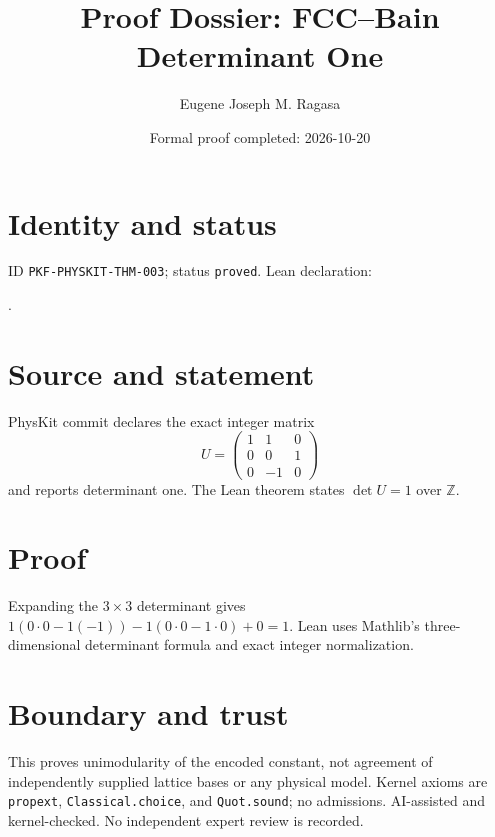 \documentclass[11pt]{article}
\title{Proof Dossier: FCC--Bain Determinant One}\author{Eugene Joseph M. Ragasa}\date{Formal proof completed: 2026-10-20}
\begin{document}
\maketitle
\section{Identity and status}
ID \texttt{PKF-PHYSKIT-THM-003}; status \texttt{proved}. Lean declaration:
\par{}.
\section{Source and statement}
PhysKit commit  declares the exact integer matrix
\[
U=\begin{pmatrix}1&1&0\\0&0&1\\0&-1&0\end{pmatrix}
\]
and reports determinant one. The Lean theorem states $\det U=1$ over $\mathbb Z$.
\section{Proof}
Expanding the $3\times3$ determinant gives
$1(0\cdot0-1(-1))-1(0\cdot0-1\cdot0)+0=1$.
Lean uses Mathlib's three-dimensional determinant formula and exact integer normalization.
\section{Boundary and trust}
This proves unimodularity of the encoded constant, not agreement of independently supplied
lattice bases or any physical model. Kernel axioms are \texttt{propext},
\texttt{Classical.choice}, and \texttt{Quot.sound}; no admissions. AI-assisted and
kernel-checked. No independent expert review is recorded.
\end{document}
